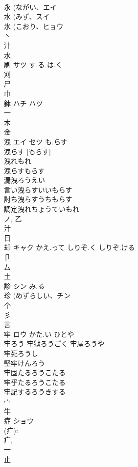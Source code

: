 \documentclass[8pt]{extreport}
\begin{document}
\begin{CJK}{UTF8}{min}
\\	永 (ながい、エイ 
\\	水 (みず、スイ 
\\	氷 (こおり、ヒョウ 
\\	丶 
\\	汁 
\\	水 
\\	刷	サツ	す.る は.く	
\\	刈 
\\	尸 
\\	巾 
\\	鉢	ハチ ハツ		
\\	一 
\\	木 
\\	金 
\\	洩	エイ セツ	も.らす	
\\	洩らす [もらす] 
\\	洩れもれ
\\	洩らすもらす
\\	漏洩ろうえい
\\	言い洩らすいいもらす
\\	討ち洩らすうちもらす
\\	調定洩れちょうていもれ
\\	ノ, 乙 
\\	汁 
\\	日 
\\	却	キャク	かえ.って しりぞ.く しりぞ.ける	
\\	卩 
\\	厶 
\\	土 
\\	診	シン	み.る	
\\	珍 (めずらしい、チン 
\\	个 
\\	彡 
\\	言 
\\	牢	ロウ	かた.い ひとや	
\\	牢ろう 牢獄ろうごく 牢屋ろうや 
\\	牢死ろうし 
\\	堅牢けんろう 
\\	牢固たるろうこたる 
\\	牢乎たるろうこたる 
\\	牢記するろうきする 
\\	宀 
\\	牛 
\\	症	ショウ		
\\	(疒): 
\\	疒, 
\\	一 
\\	止 

\end{CJK}
\end{document}
